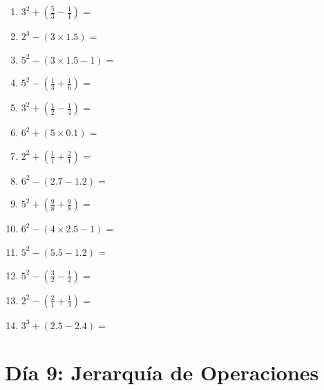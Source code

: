 \documentclass[12pt]{article}
\begin{document}
\begin{enumerate}
\item \large $ 3^{2} + (\frac{5}{3} - \frac{1}{1}) = $ \vspace{1.4cm}
\item \large $ 2^{3} - (3 \times 1.5) = $ \vspace{1.4cm}
\newpage
\item \large $ 5^{2} - (3 \times 1.5 - 1) = $ \vspace{1.4cm}
\item \large $ 5^{2} - (\frac{1}{3} + \frac{1}{6}) = $ \vspace{1.4cm}
\item \large $ 3^{2} + (\frac{1}{2} - \frac{1}{4}) = $ \vspace{1.4cm}
\item \large $ 6^{2} + (5 \times 0.1) = $ \vspace{1.4cm}
\item \large $ 2^{2} + (\frac{1}{1} + \frac{2}{1}) = $ \vspace{1.4cm}
\item \large $ 6^{2} - (2.7 - 1.2) = $ \vspace{1.4cm}
\item \large $ 5^{2} + (\frac{9}{8} + \frac{9}{8}) = $ \vspace{1.4cm}
\item \large $ 6^{2} - (4 \times 2.5 - 1) = $ \vspace{1.4cm}
\item \large $ 5^{2} - (5.5 - 1.2) = $ \vspace{1.4cm}
\item \large $ 5^{2} - (\frac{3}{2} - \frac{1}{2}) = $ \vspace{1.4cm}
\newpage
\item \large $ 2^{2} - (\frac{2}{1} + \frac{1}{3}) = $ \vspace{1.4cm}
\item \large $ 3^{3} + (2.5 - 2.4) = $ \vspace{1.4cm}
\end{enumerate}
\newpage
\section*{Día 9: Jerarquía de Operaciones}
\end{document}
